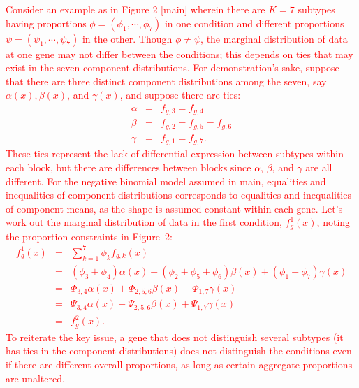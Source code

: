 \documentclass[aoas,preprint]{imsart}
\begin{document}
\textcolor{red}{Consider an example as in Figure 2 [main] wherein there are $K=7$ subtypes having 
proportions $\phi=(\phi_1, \cdots, \phi_7)$ in one condition and different proportions 
$\psi = (\psi_1, \cdots, \psi_7)$ in the other.  Though $\phi \neq \psi$, the marginal
distribution of data at one gene may not differ between the conditions; this depends on
ties that may exist in the seven component distributions.  For demonstration's sake, suppose
that there are three distinct component distributions among the seven, say $\alpha(x), \beta(x)$,
and $\gamma(x)$, and suppose there are ties:
\begin{eqnarray*}
\alpha &=& f_{g,3} = f_{g,4} \\
\beta  &=& f_{g,2}= f_{g,5} = f_{g,6} \\
\gamma &=& f_{g,1} = f_{g,7}. 
\end{eqnarray*}
These ties represent the lack of differential expression between subtypes within each block, but
there are differences between blocks since $\alpha$, $\beta$, and $\gamma$ are all different. 
For the negative binomial model assumed in main, equalities and inequalities of component distributions corresponds to equalities and inequalities of component means, as the shape is assumed constant 
within each gene.
 Let's work out the marginal distribution of data in the first
condition, $f^1_g(x)$, noting the proportion constraints in Figure~2:
\begin{eqnarray*}
f^1_g(x) &=& \sum_{k=1}^7 \phi_k f_{g,k} (x) \\
       &=& (\phi_3+\phi_4) \alpha(x) + (\phi_2+\phi_5+\phi_6) \beta(x) + (\phi_1+\phi_7) \gamma(x) \\
   & = & \Phi_{3,4} \alpha(x) + \Phi_{2,5,6} \beta(x) + \Phi_{1,7} \gamma(x) \\
   &=&  \Psi_{3,4} \alpha(x) + \Psi_{2,5,6} \beta(x) + \Psi_{1,7} \gamma(x) \\
   &=& f^2_g(x) .
\end{eqnarray*}
To reiterate the key issue, a gene that does not distinguish several subtypes (it has ties in
the component distributions) does not distinguish the conditions even if there are 
different overall proportions, as long as certain aggregate proportions are unaltered.}
\end{document}
